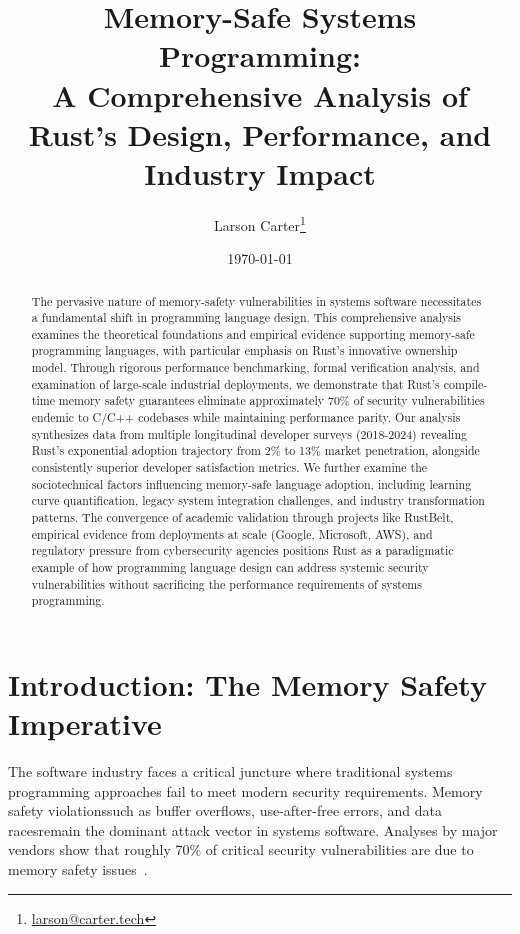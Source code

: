 \documentclass[11pt]{article}
\title{Memory-Safe Systems Programming:\\A Comprehensive Analysis of Rust's Design, Performance, and Industry Impact}
\author{Larson Carter\thanks{\href{mailto:larson@carter.tech}{larson@carter.tech}}}
\date{\today}
\begin{document}
\maketitle
\begin{abstract}
The pervasive nature of memory-safety vulnerabilities in systems software necessitates a fundamental shift in programming language design. This comprehensive analysis examines the theoretical foundations and empirical evidence supporting memory-safe programming languages, with particular emphasis on Rust's innovative ownership model. Through rigorous performance benchmarking, formal verification analysis, and examination of large-scale industrial deployments, we demonstrate that Rust's compile-time memory safety guarantees eliminate approximately 70\% of security vulnerabilities endemic to C/C++ codebases while maintaining performance parity. Our analysis synthesizes data from multiple longitudinal developer surveys (2018-2024) revealing Rust's exponential adoption trajectory from 2\% to 13\% market penetration, alongside consistently superior developer satisfaction metrics. We further examine the sociotechnical factors influencing memory-safe language adoption, including learning curve quantification, legacy system integration challenges, and industry transformation patterns. The convergence of academic validation through projects like RustBelt, empirical evidence from deployments at scale (Google, Microsoft, AWS), and regulatory pressure from cybersecurity agencies positions Rust as a paradigmatic example of how programming language design can address systemic security vulnerabilities without sacrificing the performance requirements of systems programming.
\end{abstract}

\tableofcontents
\newpage

\section{Introduction: The Memory Safety Imperative}

The software industry faces a critical juncture where traditional systems programming approaches fail to meet modern security requirements. Memory safety violations\textemdash such as buffer overflows, use-after-free errors, and data races\textemdash remain the dominant attack vector in systems software. Analyses by major vendors show that roughly 70\% of critical security vulnerabilities are due to memory safety issues~\cite{msrc2019survey,google2022android}.
\end{document}
